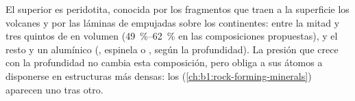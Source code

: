 El  superior es peridotita, conocida por los fragmentos que traen a la superficie los volcanes y por las láminas de 
empujadas sobre los continentes: entre la mitad y tres quintos de  en volumen (\qtyrange{49}{62}{\percent} en las
composiciones propuestas), y el resto  y un  alumínico (, espinela o , según la profundidad).
La presión que crece con la profundidad no cambia esta composición, pero obliga a sus átomos a disponerse en estructuras más
densas: los  (\cref{ch:b1:rock-forming-minerals}) aparecen uno tras otro.

